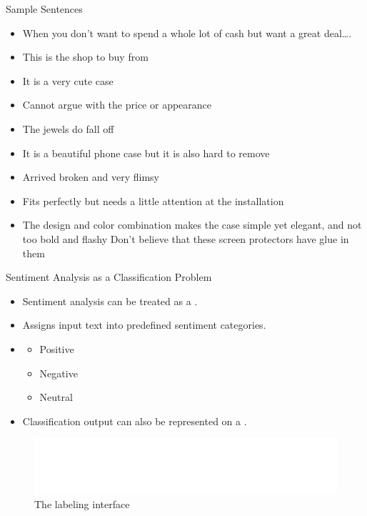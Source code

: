 \begin{frame}{Sample Sentences}
\begin{itemize}
\item When you don’t want to spend a whole lot of cash but want a great deal….
\item This is the shop to buy from
\item It is a very cute case
\item Cannot argue with the price or appearance
\item The jewels do fall off
\item It is a beautiful phone case but it is also hard to remove
\item Arrived broken and very flimsy
\item Fits perfectly but needs a little attention at the installation
\item The design and color combination makes the case simple yet elegant, and not too bold and flashy
Don’t believe that these screen protectors have glue in them
\end{itemize}
\end{frame}


\begin{frame}{Sentiment Analysis as a Classification Problem}
    \begin{itemize}
        \item Sentiment analysis can be treated as a    .
        \item Assigns input text into predefined sentiment categories.
        \item [] 
        \begin{itemize}
            \item Positive
            \item Negative
            \item Neutral
        \end{itemize}
        \item Classification output can also be represented on a .
    \end{itemize}
    \begin{figure}
    \centering
    \includegraphics[width=0.7\linewidth]{Images/SAScale}
    \caption{The labeling interface\cite{socher-etal-2013-recursive}}
    \label{fig:sascale}
    \end{figure}


\end{frame}

